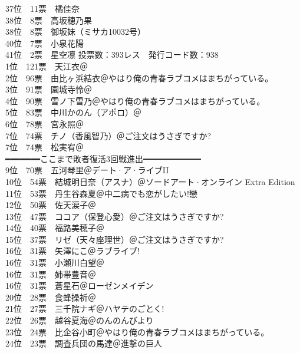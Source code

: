 {    37位　11票　橘佳奈\\
    38位　8票　高坂穂乃果\\
    38位　8票　御坂妹（ミサカ10032号）\\
    40位　7票　小泉花陽\\
    41位　2票　星空凛
    }{
    投票数：393レス　発行コード数：938\\
    1位　121票　天江衣＠\Saki\\
    2位　96票　由比ヶ浜結衣＠{やはり俺の青春ラブコメはまちがっている。}\\
    3位　91票　園城寺怜＠\Saki\\
    4位　90票　雪ノ下雪乃＠{やはり俺の青春ラブコメはまちがっている。}\\
    5位　83票　中川かのん（アポロ）＠{\Kaminomi}\\
    6位　78票　宮永照＠\Saki\\
    7位　74票　チノ（香風智乃）＠ご注文はうさぎですか?\\
    7位　74票　松実宥＠\Saki\\
    ━━━━━━━ここまで敗者復活3回戦進出━━━━━━━\\
    9位　70票　五河琴里＠デート·ア·ライブII\\
    10位　54票　結城明日奈（アスナ）＠ソードアート·オンライン Extra Edition\\
    11位　53票　丹生谷森夏＠中二病でも恋がしたい!戀\\
    12位　50票　佐天涙子＠\Railgan\\
    13位　47票　ココア（保登心愛）＠ご注文はうさぎですか?\\
    14位　40票　福路美穂子＠\Saki\\
    15位　37票　リゼ（天々座理世）＠ご注文はうさぎですか?\\
    16位　31票　矢澤にこ＠ラブライブ!\\
    16位　31票　小瀬川白望＠\Saki\\
    16位　31票　姉帯豊音＠\Saki\\
    16位　31票　蒼星石＠ローゼンメイデン\\
    20位　28票　食蜂操祈＠\Railgan\\
    21位　27票　三千院ナギ＠ハヤテのごとく!\\
    22位　26票　越谷夏海＠のんのんびより\\
    23位　24票　比企谷小町＠やはり俺の青春ラブコメはまちがっている。\\
    24位　23票　調査兵団の馬達＠進撃の巨人\\
}
